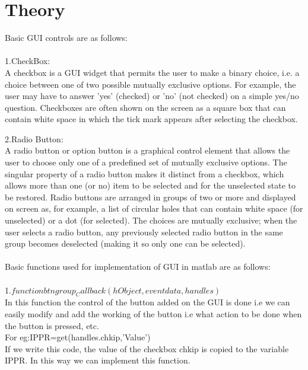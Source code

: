 \documentclass[12pt]{article}
\begin{document}

\tableofcontents
\pagebreak
\section{Theory}
Basic GUI controls are as follows:\\\\
1.CheckBox:\\
A checkbox  is a GUI widget that permits the user to make a binary choice, i.e. a choice between one of two possible mutually exclusive options. For example, the user may have to answer 'yes' (checked) or 'no' (not checked) on a simple yes/no question.
Checkboxes are often shown on the screen as a square box that can contain white space in which the tick mark appears after selecting the checkbox.
 
2.Radio Button:\\
A radio button or option button is a graphical control element that allows the user to choose only one of a predefined set of mutually exclusive options. The singular property of a radio button makes it distinct from a checkbox, which allows more than one (or no) item to be selected and for the unselected state to be restored.
Radio buttons are arranged in groups of two or more and displayed on screen as, for example, a list of circular holes that can contain white space (for unselected) or a dot (for selected). The choices are mutually exclusive; when the user selects a radio button, any previously selected radio button in the same group becomes deselected (making it so only one can be selected).\\\\

Basic functions used for implementation of GUI in matlab are as follows:\\\\
1.$function btngroup_Callback(hObject, eventdata, handles)$\\
In this function the control of the button added on the GUI is done i.e we can easily modify and add the working of the button i.e what action to be done when the button is pressed, etc.\\
For eg:IPPR=get(handles.chkip,'Value')\\
If we write this code, the value of the checkbox chkip is copied to the variable IPPR. In this way we can implement this function.\\\\
\end{document}
